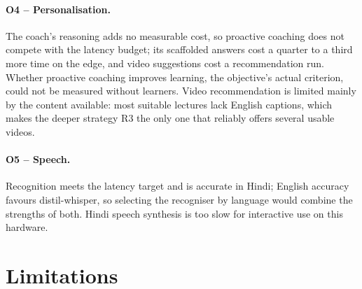\paragraph{O4 -- Personalisation.} The coach's reasoning adds no measurable cost, so proactive
coaching does not compete with the latency budget; its scaffolded answers cost a quarter to a third more
time on the edge, and video suggestions cost a recommendation run. Whether proactive coaching improves
learning, the objective's actual criterion, could not be measured without learners. Video recommendation
is limited mainly by the content available: most suitable lectures lack English captions, which makes the
deeper strategy R3 the only one that reliably offers several usable videos.

\paragraph{O5 -- Speech.} Recognition meets the latency target and is accurate in Hindi; English accuracy
favours distil-whisper, so selecting the recogniser by language would combine the strengths of both.
Hindi speech synthesis is too slow for interactive use on this hardware.

\section{Limitations}
\label{sec:limitations}

